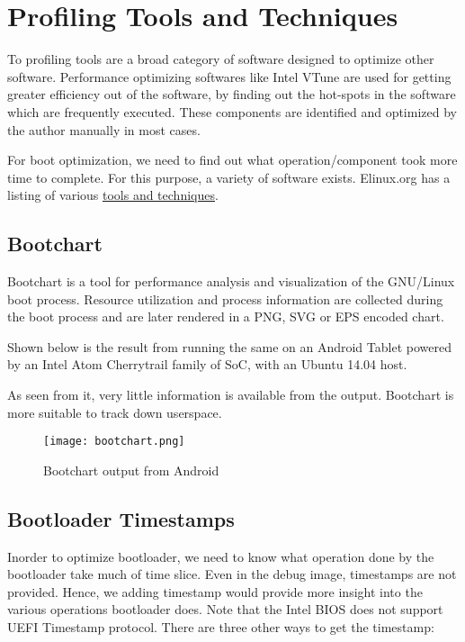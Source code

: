 

\section{Profiling Tools and Techniques}
\label{prof_tools_techniques}


\hspace{8mm} 

\noindent To profiling tools are a broad category of software designed to optimize other
software. Performance optimizing softwares like Intel VTune are used for getting
greater efficiency out of the software, by finding out the hot-spots in the
software which are frequently executed. These components are identified and
optimized by the author manually in most cases.

For boot optimization, we need to find out what operation/component took more
time to complete. For this purpose, a variety of software exists. Elinux.org
has a listing of various \href{http://elinux.org/Boot_Time}{tools and techniques}.

\subsection{Bootchart}

Bootchart is a tool for performance analysis and visualization of the
GNU/Linux boot process. Resource utilization and process information are collected
during the boot process and are later rendered in a PNG, SVG or EPS encoded chart.

Shown below is the result from running the same on an Android Tablet
powered by an Intel Atom Cherrytrail family of SoC, with an Ubuntu 14.04 host.

As seen from it, very little information is available from the output.
Bootchart is more suitable to track down userspace.

\begin{figure}[h]
  \centering
    \texttt{[image: bootchart.png]}
    \caption{Bootchart output from Android}
    \label{fig:android_boot}
\end{figure}

\clearpage

\subsection{Bootloader Timestamps}

Inorder to optimize bootloader, we need to know what operation done by the
bootloader take much of time slice. Even in the debug image, timestamps
are not provided. Hence, we adding timestamp would provide more insight into
the various operations bootloader does. Note that the 
Intel BIOS does not support UEFI Timestamp protocol. There are three
other ways to get the timestamp:

